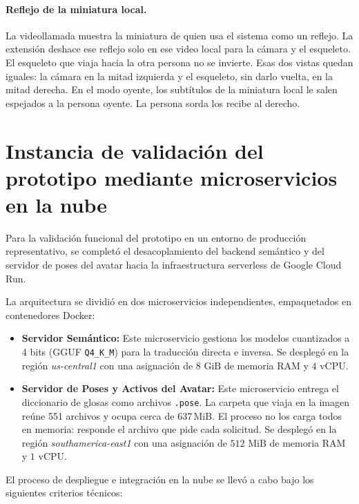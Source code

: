 \paragraph{Reflejo de la miniatura local.}
La videollamada muestra la miniatura de quien usa el sistema como un reflejo. La extensión deshace ese reflejo solo en ese video local para la cámara y el esqueleto. El esqueleto que viaja hacia la otra persona no se invierte. Esas dos vistas quedan iguales: la cámara en la mitad izquierda y el esqueleto, sin darlo vuelta, en la mitad derecha. En el modo oyente, los subtítulos de la miniatura local le salen espejados a la persona oyente. La persona sorda los recibe al derecho.

\section{Instancia de validación del prototipo mediante microservicios en la nube}
\label{sec:arquitectura_produccion}
Para la validación funcional del prototipo en un entorno de producción representativo, se completó el desacoplamiento del backend semántico y del servidor de poses del avatar hacia la infraestructura serverless de Google Cloud Run.

La arquitectura se dividió en dos microservicios independientes, empaquetados en contenedores Docker:

\begin{itemize}
    \item \textbf{Servidor Semántico:} 
    Este microservicio gestiona los modelos cuantizados a 4 bits (GGUF \texttt{Q4\_K\_M}) para la traducción directa e inversa. Se desplegó en la región \textit{us-central1} con una asignación de $8\text{~GiB}$ de memoria RAM y $4\text{~vCPU}$.
    
    \item \textbf{Servidor de Poses y Activos del Avatar:} 
    Este microservicio entrega el diccionario de glosas como archivos \texttt{.pose}. La carpeta que viaja en la imagen reúne 551 archivos y ocupa cerca de 637\,MiB. El proceso no los carga todos en memoria: responde el archivo que pide cada solicitud. Se desplegó en la región \textit{southamerica-east1} con una asignación de $512\text{~MiB}$ de memoria RAM y $1\text{~vCPU}$.
\end{itemize}

El proceso de despliegue e integración en la nube se llevó a cabo bajo los siguientes criterios técnicos:

